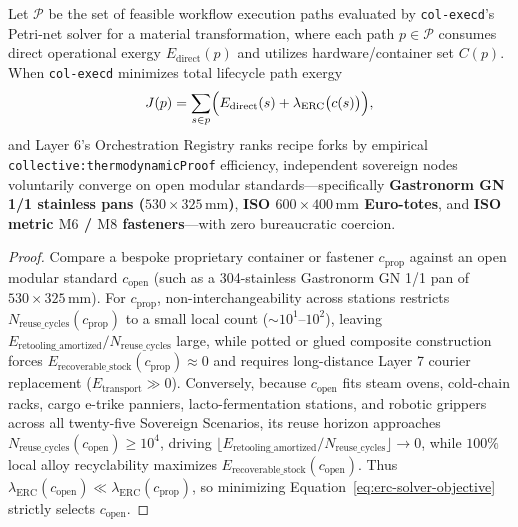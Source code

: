 \begin{proposition}
\label{prop:erc-modular-convergence}
Let $\mathcal{P}$ be the set of feasible workflow execution paths evaluated by \texttt{col-execd}'s Petri-net solver for a material transformation, where each path $p \in \mathcal{P}$ consumes direct operational exergy $E_{\mathrm{direct}}(p)$ and utilizes hardware/container set $C(p)$. When \texttt{col-execd} minimizes total lifecycle path exergy
\begin{equation}
\label{eq:erc-solver-objective}
J(p) = \sum_{s \in p} \Bigl( E_{\mathrm{direct}}(s) + \lambda_{\mathrm{ERC}}\bigl(c(s)\bigr) \Bigr),
\end{equation}
and Layer 6's Orchestration Registry ranks recipe forks by empirical \texttt{collective:thermodynamicProof} efficiency, independent sovereign nodes voluntarily converge on open modular standards---specifically \textbf{Gastronorm GN 1/1 stainless pans ($530 \times 325\,\mathrm{mm}$)}, \textbf{ISO $600 \times 400\,\mathrm{mm}$ Euro-totes}, and \textbf{ISO metric $\mathrm{M6}$ / $\mathrm{M8}$ fasteners}---with zero bureaucratic coercion.
\end{proposition}

\begin{proof}
Compare a bespoke proprietary container or fastener $c_{\mathrm{prop}}$ against an open modular standard $c_{\mathrm{open}}$ (such as a 304-stainless Gastronorm GN 1/1 pan of $530 \times 325\,\mathrm{mm}$). For $c_{\mathrm{prop}}$, non-interchangeability across stations restricts $N_{\mathrm{reuse\_cycles}}(c_{\mathrm{prop}})$ to a small local count ($\sim 10^1\text{--}10^2$), leaving $E_{\mathrm{retooling\_amortized}} / N_{\mathrm{reuse\_cycles}}$ large, while potted or glued composite construction forces $E_{\mathrm{recoverable\_stock}}(c_{\mathrm{prop}}) \approx 0$ and requires long-distance Layer 7 courier replacement ($E_{\mathrm{transport}} \gg 0$). Conversely, because $c_{\mathrm{open}}$ fits steam ovens, cold-chain racks, cargo e-trike panniers, lacto-fermentation stations, and robotic grippers across all twenty-five Sovereign Scenarios, its reuse horizon approaches $N_{\mathrm{reuse\_cycles}}(c_{\mathrm{open}}) \ge 10^4$, driving $\lfloor E_{\mathrm{retooling\_amortized}} / N_{\mathrm{reuse\_cycles}} \rfloor \to 0$, while $100\%$ local alloy recyclability maximizes $E_{\mathrm{recoverable\_stock}}(c_{\mathrm{open}})$. Thus $\lambda_{\mathrm{ERC}}(c_{\mathrm{open}}) \ll \lambda_{\mathrm{ERC}}(c_{\mathrm{prop}})$, so minimizing Equation~\ref{eq:erc-solver-objective} strictly selects $c_{\mathrm{open}}$.
\end{proof}


